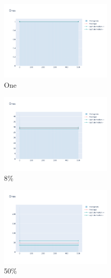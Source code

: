 \documentclass[12pt, fleqn]{report}                             %
\theoremstyle{break}                                            %
\begin{document}
      \begin{figure}[ht!]
        \centering
        \begin{subfigure}[b]{0.4\linewidth}
          \includegraphics[width=0.6\textwidth]{Images/164/dia-a.png}
          \caption{One}
        \end{subfigure}
        \begin{subfigure}[b]{0.4\linewidth}
          \includegraphics[width=0.6\textwidth]{Images/164/dia-b.png}
          \caption{8\%}
        \end{subfigure}
        \begin{subfigure}[b]{0.4\linewidth}
          \includegraphics[width=0.6\textwidth]{Images/164/dia-c.png}
          \caption{50\%}
        \end{subfigure}
        \begin{subfigure}[b]{0.4\linewidth}

\end{subfigure}
\end{figure}
\end{document}
